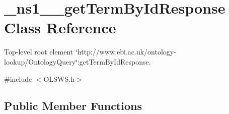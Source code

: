 \hypertarget{class__ns1____getTermByIdResponse}{
\section{\_\-ns1\_\-\_\-getTermByIdResponse Class Reference}
\label{class__ns1____getTermByIdResponse}
}


Top-\/level root element \char`\"{}http://www.ebi.ac.uk/ontology-\/lookup/OntologyQuery\char`\"{}:getTermByIdResponse.  




{\ttfamily \#include $<$OLSWS.h$>$}

\subsection*{Public Member Functions}
